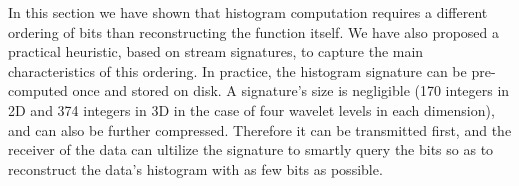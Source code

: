 In this section we have shown that histogram computation requires a different ordering of bits than
reconstructing the function itself. We have also proposed a practical heuristic, based on stream
signatures, to capture the main characteristics of this ordering. In practice, the histogram
signature can be pre-computed once and stored on disk. A signature's size is negligible (170
integers in 2D and 374 integers in 3D in the case of four wavelet levels in each dimension), and can
also be further compressed. Therefore it can be transmitted first, and the receiver of the data can
ultilize the signature to smartly query the bits so as to reconstruct the data's histogram with as
few bits as possible.
